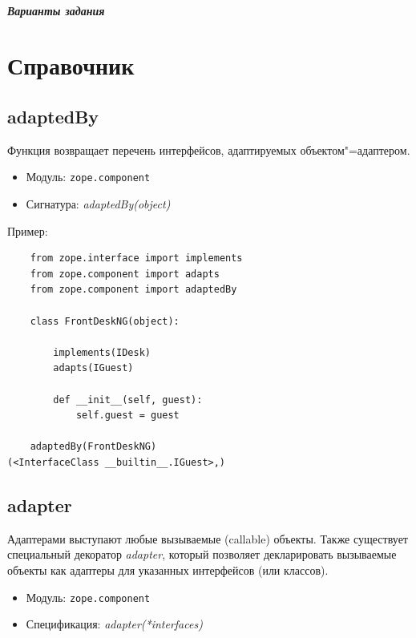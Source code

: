 \documentclass[a4paper,openany,twoside,draft]{book}
\providecommand*{\DUroletitlereference}[1]{\textsl{#1}}
\begin{document}
\paragraph{Варианты задания}
\newpage


\chapter{Справочник%
  \label{id54}%
}


\section*{adaptedBy%
  \label{adaptedby}%
}

Функция возвращает перечень интерфейсов, адаптируемых объектом"=адаптером.

\begin{itemize}

\item Модуль: \texttt{zope.component}

\item Сигнатура: \DUroletitlereference{adaptedBy(object)}

\end{itemize}

Пример:

\begin{verbatim}
    from zope.interface import implements
    from zope.component import adapts
    from zope.component import adaptedBy

    class FrontDeskNG(object):

        implements(IDesk)
        adapts(IGuest)

        def __init__(self, guest):
            self.guest = guest

    adaptedBy(FrontDeskNG)
(<InterfaceClass __builtin__.IGuest>,)
\end{verbatim}


\section*{adapter%
  \label{id55}%
}

Адаптерами выступают любые вызываемые (callable) объекты.  Также существует специальный декоратор \DUroletitlereference{adapter}, который позволяет декларировать вызываемые объекты как адаптеры для указанных интерфейсов (или классов).

\begin{itemize}

\item Модуль: \texttt{zope.component}

\item Спецификация: \DUroletitlereference{adapter(*interfaces)}

\end{itemize}
\end{document}
